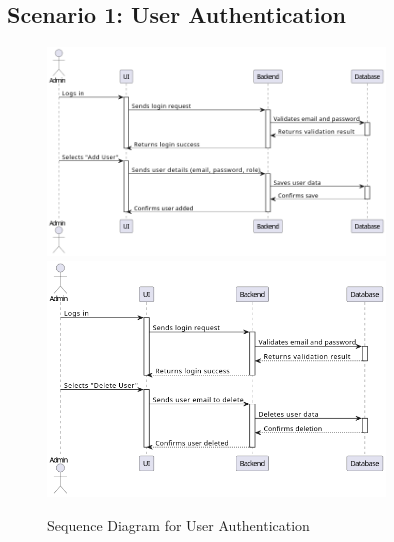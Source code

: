 \subsection{Scenario 1: User Authentication}
\begin{figure}[H]
    \centering
    \includegraphics[width=0.8\textwidth]{Graphics/sequence_Diagram_Case_1Admin_adds_User.drawio.png}
    \includegraphics[width=0.8\textwidth]{Graphics/sequence_diagram_Admin_Deletes_User.drawio.png}
    \caption{Sequence Diagram for User Authentication}
    \label{fig:sequence_diagram_authentication}
\end{figure}

